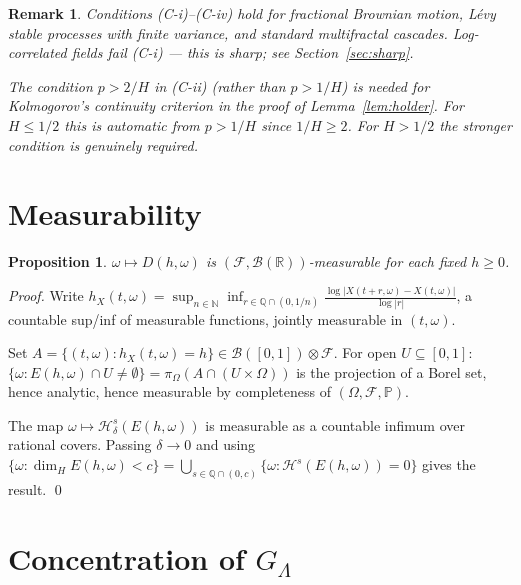 \documentclass[10pt,a4paper]{amsart}
\newtheorem{proposition}[theorem]{Proposition}
\newtheorem{remark}[theorem]{Remark}
\newcommand{\R}{\mathbb{R}}
\begin{document}
\begin{remark}
Conditions (C-i)--(C-iv) hold for fractional Brownian motion,
L\'{e}vy stable processes with finite variance, and standard
multifractal cascades. Log-correlated fields fail (C-i) --- this is
sharp; see Section~\ref{sec:sharp}.

The condition $p>2/H$ in (C-ii) (rather than $p>1/H$) is needed for
Kolmogorov's continuity criterion in the proof of
Lemma~\ref{lem:holder}. For $H\le1/2$ this is automatic from $p>1/H$
since $1/H\ge2$. For $H>1/2$ the stronger condition is genuinely
required.
\end{remark}

\section{Measurability}

\begin{proposition}\label{prop:meas}
$\omega\mapsto D(h,\omega)$ is $(\mathcal{F},\mathcal{B}(\R))$-measurable
for each fixed $h\ge0$.
\end{proposition}

\begin{proof}
Write
$h_X(t,\omega)=\sup_{n\in\mathbb{N}}\inf_{r\in\mathbb{Q}\cap(0,1/n)}
\frac{\log|X(t+r,\omega)-X(t,\omega)|}{\log|r|}$,
a countable sup/inf of measurable functions, jointly measurable in
$(t,\omega)$.

Set $A=\{(t,\omega):h_X(t,\omega)=h\}\in\mathcal{B}([0,1])\otimes\mathcal{F}$.
For open $U\subseteq[0,1]$:
$\{\omega:E(h,\omega)\cap U\ne\emptyset\}=\pi_\Omega(A\cap(U\times\Omega))$
is the projection of a Borel set, hence analytic, hence measurable by
completeness of $(\Omega,\mathcal{F},\mathbb{P})$.

The map $\omega\mapsto\mathcal{H}^s_\delta(E(h,\omega))$ is measurable
as a countable infimum over rational covers. Passing $\delta\to0$ and
using $\{\omega:\dim_H E(h,\omega)<c\}=\bigcup_{s\in\mathbb{Q}\cap(0,c)}
\{\omega:\mathcal{H}^s(E(h,\omega))=0\}$ gives the result. \qed
\end{proof}

\section{Concentration of $G_\Lambda$}
\end{document}
